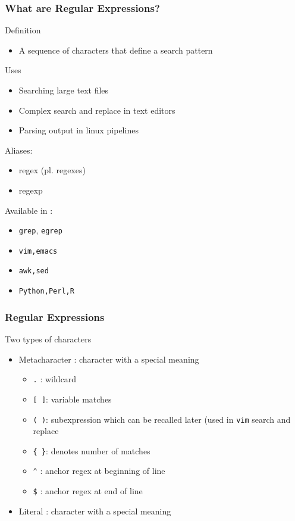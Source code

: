 \documentclass{beamer}
\newcommand{\code}[1]{\colorbox{codegray}{\texttt{#1}}}
\begin{document}
\begin{frame}
\frametitle{What are Regular Expressions?}
Definition
\begin{itemize}
    \item A sequence of characters that define a search pattern
\end{itemize}
\pause
Uses
\begin{itemize}
    \item Searching large text files
    \pause
    \item Complex search and replace in text editors
    \pause
    \item Parsing output in linux pipelines
\end{itemize}
\pause
Aliases:
\begin{itemize}
    \item regex (pl. regexes)
    \pause
    \item regexp
\end{itemize}
\pause
Available in :
\begin{itemize}
    \item \code{grep}, \code{egrep}
    \pause
    \item \code{vim,emacs}
    \pause
    \item \code{awk,sed}
    \pause
    \item \code{Python,Perl,R}
\end{itemize}
\end{frame}


\begin{frame}
\frametitle{Regular Expressions}
Two types of characters
\begin{itemize}
    \item Metacharacter : character with a special meaning
    \begin{itemize}
        \item \code{.} : wildcard 
        \pause
        \item \code{[ ]}: variable matches
        \pause
        \item \code{( )}: subexpression which can be recalled later (used in \code{vim} search and replace
        \pause
        \item \code{\{ \}}: denotes number of matches
        \pause
        \item \code{\^{}} : anchor regex at beginning of line
        \pause
        \item \code{\$} : anchor regex at end of line
    \end{itemize}
    \pause
    \item Literal : character with a special meaning
\end{itemize}
\end{frame}
\end{document}
